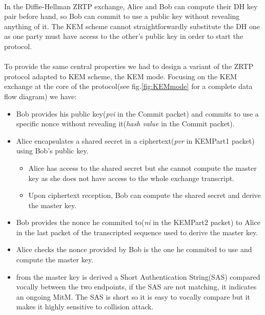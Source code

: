 \documentclass[a4paper,11pt]{article}
\begin{document}
\paragraph*{}In the Diffie-Hellman ZRTP exchange, Alice and Bob can compute their DH key pair before hand, so Bob can commit to use a public key without revealing anything of it. The KEM scheme cannot straightforwardly substitute the DH one as one party must have access to the other's public key in order to start the protocol.
\paragraph*{}To provide the same central properties we had to design a variant of the ZRTP protocol adapted to KEM scheme, the KEM mode. Focusing on the KEM exchange at the core of the protocol(see fig.\ref{fig:KEMmode} for a complete data flow diagram) we have:
\begin{itemize}
  \item Bob provides his public key(\textit{pvi} in the Commit packet) and commits to use a specific nonce without revealing it(\textit{hash value} in the Commit packet).
  \item Alice encapsulates a shared secret in a ciphertext(\textit{pvr} in KEMPart1 packet) using Bob's public key.
  \begin{itemize}
    \item Alice has access to the shared secret but she cannot compute the master key as she does not have access to the whole exchange transcript.
    \item Upon ciphertext reception, Bob can compute the shared secret and derive the master key.
  \end{itemize} 
  \item Bob provides the nonce he commited to(\textit{ni} in the KEMPart2 packet) to Alice in the last packet of the transcripted sequence used to derive the master key.
  \item Alice checks the nonce provided by Bob is the one he commited to use and compute the master key.
  \item from the master key is derived a Short Authentication String(SAS) compared vocally between the two endpoints, if the SAS are not matching, it indicates an ongoing MitM. The SAS is short so it is easy to vocally compare but it makes it highly sensitive to collision attack.
\end{itemize}
\end{document}
